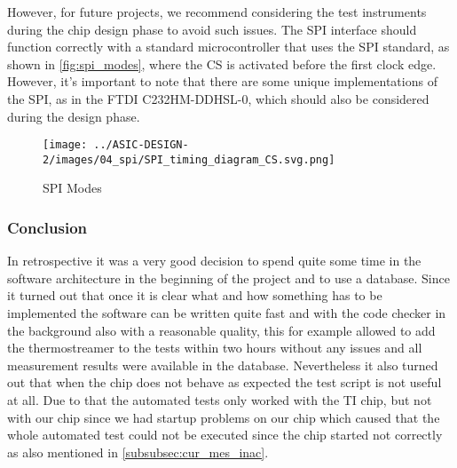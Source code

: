 However, for future projects, we recommend considering the test instruments during the chip design phase to avoid such issues. The SPI interface should function correctly with a standard microcontroller that uses the SPI standard, as shown in \autoref{fig:spi_modes}, where the CS is activated before the first clock edge. However, it's important to note that there are some unique implementations of the SPI, as in the FTDI C232HM-DDHSL-0, which should also be considered during the design phase.

\begin{figure}[h]
    \centering
    \texttt{[image: ../ASIC-DESIGN-2/images/04\_spi/SPI\_timing\_diagram\_CS.svg.png]}
    \caption{SPI Modes \cite{Wikipedia:SPI}}
    \label{fig:spi_modes}
\end{figure}
\subsubsection{Conclusion}
In retrospective it was a very good decision to spend quite some time in the software architecture in the beginning of the project and to use a database. Since it turned out that once it is clear what and how something has to be implemented the software can be written quite fast and with the code checker in the background also with a reasonable quality, this for example allowed to add the thermostreamer to the tests within two hours without any issues and all measurement results were available in the database. Nevertheless it also turned out that when the chip does not behave as expected the test script is not useful at all. Due to that the automated tests only worked with the TI chip, but not with our chip since we had startup problems on our chip which caused that the whole automated test could not be executed since the chip started not correctly as also mentioned in 
\autoref{subsubsec:cur_mes_inac}.


